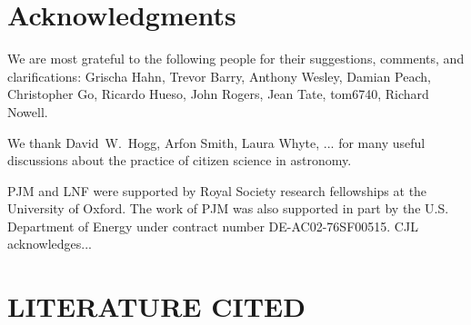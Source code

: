 \documentclass{ar2e}
\begin{document}

\section*{Acknowledgments}

We are most grateful to the following people for their suggestions,  comments,
and clarifications: Grischa Hahn, Trevor Barry, Anthony Wesley, Damian Peach, 
Christopher Go, Ricardo Hueso, John Rogers, Jean Tate, tom6740, Richard Nowell.

We thank David~W.~Hogg, Arfon Smith, Laura Whyte, ... for many useful
discussions about the practice of citizen science in astronomy.

PJM and LNF were supported by Royal Society research fellowships at the
University of Oxford. The work of PJM was also supported in part  by the U.S.
Department of Energy under contract number DE-AC02-76SF00515.
%
CJL acknowledges...



\section{LITERATURE CITED}




\end{document}
